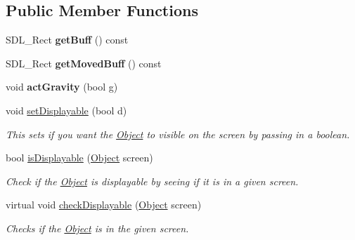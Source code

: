\subsection*{Public Member Functions}
\begin{DoxyCompactItemize}
\item 
\mbox{\label{classObject_a79f242bd97caf51ef74e45de80bf3923}} 
S\+D\+L\+\_\+\+Rect {\bfseries get\+Buff} () const
\item 
\mbox{\label{classObject_ad23c8da92051578f1eaebf4d8e93d892}} 
S\+D\+L\+\_\+\+Rect {\bfseries get\+Moved\+Buff} () const
\item 
\mbox{\label{classObject_a0678f7d75772473c00aaf196448d7f09}} 
void {\bfseries act\+Gravity} (bool g)
\item 
\mbox{\label{classObject_a6eb461900d28eba30ba6dbdb02284900}} 
void \hyperlink{classObject_a6eb461900d28eba30ba6dbdb02284900}{set\+Displayable} (bool d)
\begin{DoxyCompactList}\small\item\em This sets if you want the \hyperlink{classObject}{Object} to visible on the screen by passing in a boolean. \end{DoxyCompactList}\item 
\mbox{\label{classObject_a382084d25dd4e5c98d441c91e0ae6ec2}} 
bool \hyperlink{classObject_a382084d25dd4e5c98d441c91e0ae6ec2}{is\+Displayable} (\hyperlink{classObject}{Object} screen)
\begin{DoxyCompactList}\small\item\em Check if the \hyperlink{classObject}{Object} is displayable by seeing if it is in a given screen. \end{DoxyCompactList}\item 
\mbox{\label{classObject_afae907cba88dfbfcfd7b730349d7cb60}} 
virtual void \hyperlink{classObject_afae907cba88dfbfcfd7b730349d7cb60}{check\+Displayable} (\hyperlink{classObject}{Object} screen)
\begin{DoxyCompactList}\small\item\em Checks if the \hyperlink{classObject}{Object} is in the given screen. \end{DoxyCompactList}\item 

\end{DoxyCompactItemize}
